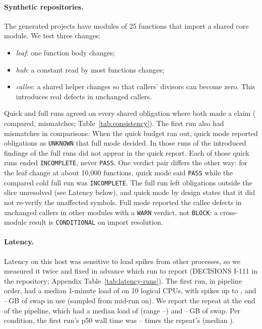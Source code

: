 \documentclass[10pt,twocolumn]{article}
\newcommand{\res}[1]{\texttt{\small #1}}
\begin{document}
\paragraph{Synthetic repositories.}
The generated projects have modules of 25 functions that import a shared core module. We test three changes:
\begin{itemize}
\item \emph{leaf}: one function body changes;
\item \emph{hub}: a constant read by most functions changes;
\item \emph{callee}: a shared helper changes so that callers' divisors can become zero. This introduces real defects in
  unchanged callers.
\end{itemize}
Quick and full runs agreed on every shared obligation where both made a claim (\ConsCompared{} compared, \ConsMismatch{}
mismatches; Table~\ref{tab:consistency}). The first run also had \ConsFirstMismatch{} mismatches in
\ConsFirstCompared{} comparisons. When the quick budget ran out, quick mode reported \ConsCovLoss{} obligations as
\res{UNKNOWN} that full mode decided. In those runs \ConsMissed{} of the \ConsIntroFull{} introduced findings of the full
runs did not appear in the quick report. Each of those quick runs ended \res{INCOMPLETE}, never \res{PASS}. One
verdict pair differs the other way: for the leaf change at about 10{,}000 functions, quick mode said \res{PASS} while the
compared cold full run was \res{INCOMPLETE}. The full run left obligations outside the slice unresolved (see
Latency below), and quick mode by design states that it did not re-verify the unaffected symbols. Full mode
reported the callee defects in unchanged callers in other modules with a \res{WARN} verdict, not \res{BLOCK}: a
cross-module result is \res{CONDITIONAL} on import resolution.

\paragraph{Latency.}
Latency on this host was sensitive to load spikes from other processes, so we measured it twice and fixed in advance
which run to report (DECISIONS I-111 in the repository; Appendix Table~\ref{tab:latency-runs}). The first run, in
pipeline order, had a median 1-minute load of \LatFirstLoadMedian{} on 10 logical CPUs, with spikes up to
\LatFirstLoadMax{}, and \LatSwapFirstMin--\LatSwapFirstMax\,GB of swap in use (sampled from mid-run on). We report
the repeat at the end of the pipeline, which had a median load of \LatLoadMedian{} (range \LatLoadMin--\LatLoadMax) and
\LatSwapRepeatMin--\LatSwapRepeatMax\,GB of swap. Per condition, the first run's p50 wall time was
\LatRatioMin--\LatRatioMax{} times the repeat's (median \LatRatioMedian).
\end{document}
